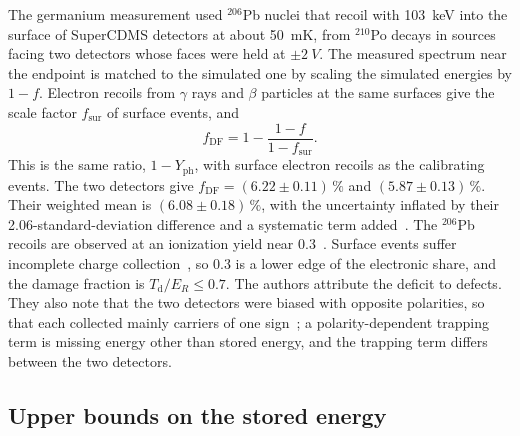 The germanium measurement used $^{206}$Pb nuclei that recoil with \SI{103}{keV} into the surface of SuperCDMS detectors at about \SI{50}{mK}, from $^{210}$Po decays in sources facing two detectors whose faces were held at $\pm\SI{2}{V}$. The measured spectrum near the endpoint is matched to the simulated one by scaling the simulated energies by $1 - f$. Electron recoils from $\gamma$ rays and $\beta$ particles at the same surfaces give the scale factor $f_{\mathrm{sur}}$ of surface events, and~\cite[Eqs.~(1), (3), (4)]{agnese2018energy}
\begin{equation*}
  f_{\mathrm{DF}} = 1 - \frac{1 - f}{1 - f_{\mathrm{sur}}} .
\end{equation*}
This is the same ratio, $1 - Y_{\mathrm{ph}}$, with surface electron recoils as the calibrating events. The two detectors give $f_{\mathrm{DF}} = (6.22 \pm 0.11)\,\%$ and $(5.87 \pm 0.13)\,\%$. Their weighted mean is $(6.08 \pm 0.18)\,\%$, with the uncertainty inflated by their 2.06-standard-deviation difference and a systematic term added~\cite[Table~II, Sect.~V\,A]{agnese2018energy}. The $^{206}$Pb recoils are observed at an ionization yield near 0.3~\cite[Sect.~II]{agnese2018energy}. Surface events suffer incomplete charge collection~\cite[Sect.~2.1]{agnese2018nuclear}, so 0.3 is a lower edge of the electronic share, and the damage fraction is $T_{\mathrm{d}}/E_R \le 0.7$. The authors attribute the deficit to defects. They also note that the two detectors were biased with opposite polarities, so that each collected mainly carriers of one sign~\cite[Sect.~V\,C]{agnese2018energy}; a polarity-dependent trapping term is missing energy other than stored energy, and the trapping term differs between the two detectors.

\subsection{Upper bounds on the stored energy}\label{sec:19.4-bounds}

